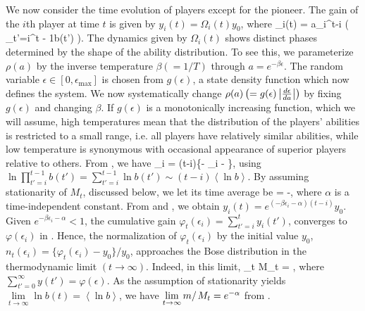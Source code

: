 \documentclass[amsmath,amssymb,floatf
ix]{revtex4}
\begin{document}
We now consider the time evolution of players except for the
pioneer. The gain of the $i$th player at time $t$ is given by
$y_i(t)=\Omega_i(t) y_0$, where
\be\label{3} \Omega _i(t) = a_i^{t-i}
\left( \prod\limits_{t'=i}^{t - 1}{b(t')} \right).  \en
The dynamics
given by $\Omega_i(t)$ shows distinct phases determined by the shape
of the ability distribution. To see this, we parameterize $\rho(a)$ by
the inverse temperature $\beta (=1/T) $ through $a = e^{ - \beta
\epsilon }$.
The random variable $\epsilon \in [0,\epsilon_{\max}]$ is chosen from $g(
\epsilon )$, a state density function which now defines the system.
We now systematically change $\rho(a) \left( = g(\epsilon)\left|
{{\textstyle{{d\epsilon } \over {da}}}} \right| \right)$ by fixing
$g(\epsilon)$ and changing $\beta$.  If $g(\epsilon)$ is a monotonically
increasing function, which we will assume, high
temperatures mean that the distribution of the players' abilities is
restricted to a small range, i.e. all players have relatively similar
abilities, while low temperature is synonymous with occasional
appearance of superior players relative to others.
From , we have
\be\label{38} \ln \Omega_i = (t-i)\left\{-
\beta \epsilon_i - \left{} \right\rangle \right\}, \en
using $\ln \prod\nolimits_{t'=i}^{t - 1} {b( t' )} = \sum\nolimits_{t'
= i}^{t - 1} {\ln b( t' )} \sim (t -i) \left\langle {\ln b}
\right\rangle$. By assuming stationarity of $M_t$, discussed below, we
let its time average be
\be\label{5}
\left{} \right\rangle = -\alpha,
\en
where $\alpha$ is a time-independent
constant.  From  and , we obtain $y_i(t) =
e^{(-\beta \epsilon_i - \alpha)(t-i)} y_0 $. Given $e^{-\beta
\epsilon_i - \alpha} < 1$, the cumulative gain $\varphi_t (\epsilon_i)
= \sum\nolimits_{t' = i}^t {y_i ( {t'} )} $, converges to $\varphi (
\epsilon_i )$ in . Hence, the normalization of $\varphi _t
(\epsilon_i )$ by the initial value $y_0$,
$n_t ( \epsilon_i  ) = \{\varphi_t (\epsilon_i) - y_0\}/{y_0}$,
approaches the Bose distribution in the thermodynamic limit $(t \to
\infty)$. Indeed, in this limit,
\be\label{11}
\mathop {\lim }\limits_{t \to \infty } M_t = ,
\en
where $\sum\nolimits_{t'=0}^\infty y(t') = \varphi(\epsilon)$.
As the assumption of stationarity yields $\mathop {\lim }\limits_{t \to
\infty } \ln b( t ) = \left\langle {\ln b} \right\rangle $, we have $\mathop
{\lim }\limits_{t \to \infty } {m \mathord{\left/ \right.} {M_t }} = e^{ -
\alpha } $ from .
\end{document}
